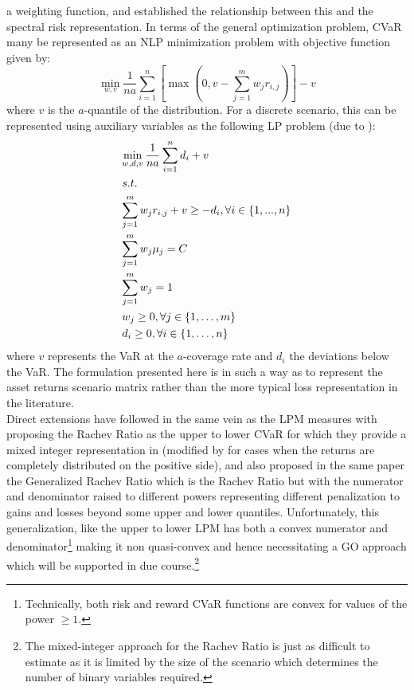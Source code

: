 a weighting function, and established the relationship between this and the
spectral risk representation. In terms of the general optimization problem,
CVaR many be represented as an NLP minimization problem with objective
function given by:
\begin{equation}
\mathop {\min }\limits_{w,v} \frac{1}{na}\sum\limits_{i=1}^n {\left[ {\max \left( {0,v - \sum\limits_{j=1}^m {{w_j}{r_{i,j}}} } \right)} \right] - v}
\end{equation}
where $v$ is the $a$-quantile of the distribution. For a discrete scenario,
this can be represented using auxiliary variables as the following LP problem
(due to \citet{Rockafellar2000}):
\begin{equation}
\begin{gathered}
  \mathop {\min }\limits_{w,d,v} \frac{1}{{na}}\sum\limits_{i=1}^n {{d_i} + v}  \hfill \\
  s.t. \hfill \\
  \sum\limits_{j=1}^m {{w_j}{r_{i,j}} + v}  \geq  - {d_i},\forall i \in \left\{ {1,...,n} \right\} \hfill \\
  \sum\limits_{j=1}^m {{w_j}{\mu _j}=C}  \hfill \\
  \sum\limits_{j=1}^m {{w_j}=1}  \hfill \\
  {w_j} \geq 0,\forall j \in \left\{ {1,\dots,m} \right\} \hfill \\
  {d_i} \geq 0,\forall i \in \left\{ {1,\dots,n} \right\} \hfill \\
\end{gathered}
\end{equation}
where $v$ represents the VaR at the $a$-coverage rate and $d_i$ the
deviations  below the VaR. The formulation presented here is in such a way
as to represent the asset returns scenario matrix rather than the more typical
loss representation in the literature.\\
Direct extensions have followed in the same vein as the LPM measures with
\citet{Biglova2004} proposing the Rachev Ratio as the upper to lower
CVaR for which they provide a mixed integer representation in
\citet{Stoyanov2007} (modified by \citet{Konno2011} for cases when
the returns are completely distributed on the positive side), and also
proposed in the same paper the Generalized Rachev Ratio which is the Rachev
Ratio but with the numerator and denominator raised to different powers
representing different penalization to gains and losses beyond some upper and
lower quantiles. Unfortunately, this generalization, like the upper to lower
LPM has both a convex numerator and denominator\footnote{Technically, both
risk and reward CVaR functions are convex for values of the power $\ge 1$.}
making it non quasi-convex and hence necessitating a GO approach which will
be supported in due course.\footnote{The mixed-integer approach for the
Rachev Ratio is just as difficult to estimate as it is limited by the size of
the scenario which determines the number of binary variables required.}
